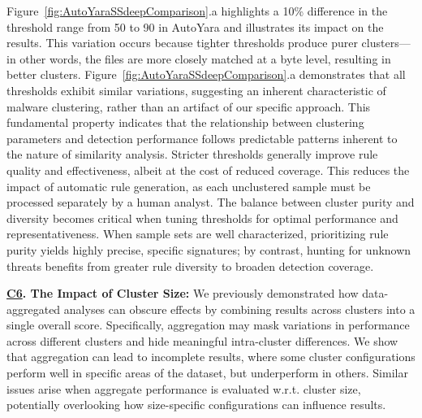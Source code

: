 Figure~\ref{fig:AutoYaraSSdeepComparison}.a highlights a 10\% difference in the threshold range from 50 to 90 in AutoYara and illustrates its impact on the results. This variation occurs because tighter thresholds produce purer clusters—in other words, the files are more closely matched at a byte level, resulting in better clusters. 
Figure~\ref{fig:AutoYaraSSdeepComparison}.a demonstrates that all thresholds exhibit similar variations, suggesting an inherent characteristic of malware clustering, rather than an artifact of our specific approach. This fundamental property indicates that the relationship between clustering parameters and detection performance follows predictable patterns inherent to the nature of similarity analysis. Stricter thresholds generally improve rule quality and effectiveness, albeit at the cost of reduced coverage. This reduces the impact of automatic rule generation, as each unclustered sample must be processed separately by a human analyst. The balance between cluster purity and diversity becomes critical when tuning thresholds for optimal performance and representativeness. When sample sets are well characterized, prioritizing rule purity yields highly precise, specific signatures; by contrast, hunting for unknown threats benefits from greater rule diversity to broaden detection coverage.
 

\noindent\textbf{\underline{C6}. The Impact of Cluster Size:} We previously demonstrated how data-aggregated analyses can obscure effects by combining results across clusters into a single overall score. Specifically, aggregation may mask variations in performance across different clusters and hide meaningful intra-cluster differences. We show that aggregation can lead to incomplete results, where some cluster configurations perform well in specific areas of the dataset, but underperform in others. Similar issues arise when aggregate performance is evaluated w.r.t. cluster size, potentially overlooking how size-specific configurations can influence results. 



